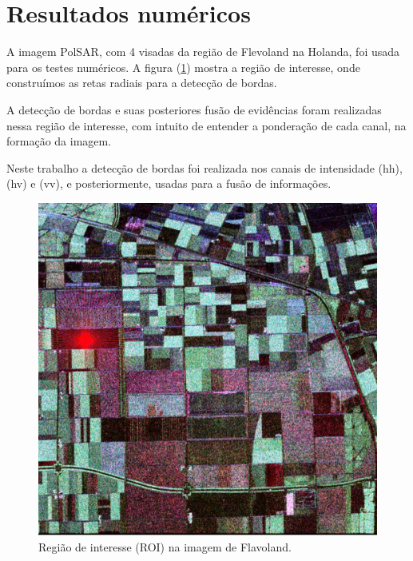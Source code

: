 \documentclass[conference]{IEEEtran}
\begin{document}
\section{Resultados numéricos}\label{sec_07}

A imagem PolSAR, com 4 visadas da região de Flevoland na Holanda, foi usada para os testes numéricos. A figura (\ref{fig_01}) mostra a região de interesse, onde construímos as retas radiais para a detecção de bordas.

 A detecção de bordas e suas posteriores fusão de evidências foram realizadas nessa região de interesse, com intuito de entender a ponderação de cada canal, na formação da imagem.

Neste trabalho a detecção de bordas foi realizada nos canais de intensidade (hh), (hv) e (vv), e posteriormente, usadas para a fusão de informações.   
\begin{figure}[hbt]
\centering
	\includegraphics[scale=0.3]{flevoland_radial_4_look.pdf}
			\vspace{-1.0cm}
	\caption{Região de interesse (ROI) na imagem de Flavoland.}
\label{fig_01}
\end{figure}
\end{document}
